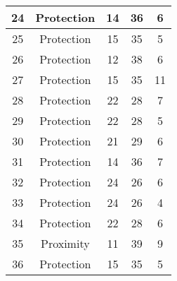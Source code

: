 \documentclass[results.tex]{subfiles}
\begin{document}
\begin{center}
\begin{tabular}{| c || c | c | c | c |}
            \hline
            24                      & Protection                   & 14                     & 36                      & 6                    \\
            \hline
            25                      & Protection                   & 15                     & 35                      & 5                    \\
            \hline
            26                      & Protection                   & 12                     & 38                      & 6                    \\
            \hline
            27                      & Protection                   & 15                     & 35                      & 11                   \\
            \hline
            28                      & Protection                   & 22                     & 28                      & 7                    \\
            \hline
            29                      & Protection                   & 22                     & 28                      & 5                    \\
            \hline
            30                      & Protection                   & 21                     & 29                      & 6                    \\
            \hline
            31                      & Protection                   & 14                     & 36                      & 7                    \\
            \hline
            32                      & Protection                   & 24                     & 26                      & 6                    \\
            \hline
            33                      & Protection                   & 24                     & 26                      & 4                    \\
            \hline
            34                      & Protection                   & 22                     & 28                      & 6                    \\
            \hline
            35                      & Proximity                    & 11                     & 39                      & 9                    \\
            \hline
            36                      & Protection                   & 15                     & 35                      & 5                    \\

\end{tabular}
\end{center}
\end{document}
